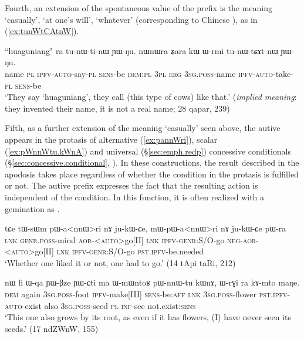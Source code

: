 Fourth, an extension of the spontaneous value of the prefix  is the meaning `casually', `at one's will', `whatever' (corresponding to Chinese ), as in (\ref{ex:tunWtCAtnW}). 

\begin{exe}
\ex \label{ex:tunWtCAtnW}
\gll ``huaguniang" ra tu-nɯ-ti-nɯ ɲɯ-ŋu. nɯnɯra ʑara kɯ ɯ-rmi tu-nɯ-tɕɤt-nɯ ɲɯ-ŋu.  \\
name \textsc{pl}	\textsc{ipfv}-\textsc{auto}-say-\textsc{pl}	\textsc{sens}-be	\textsc{dem}:\textsc{pl}	\textsc{3pl}	\textsc{erg}	\textsc{3sg}.\textsc{poss}-name	\textsc{ipfv}-\textsc{auto}-take-\textsc{pl}	\textsc{sens}-be\\
\glt `They say `huaguniang', they call (this type of cows) like that.' (\textit{implied meaning}: they invented their name, it is not a real name; 28 qapar, 239)
\end{exe}

Fifth, as a further extension of the meaning `casually' seen above, the autive appears in the protasis of alternative (\ref{ex:pannWri}), scalar (\ref{ex:pWnnWtu.kWnA}) and universal (§\ref{sec:emph.redp}) concessive conditionals (§\ref{sec:concessive.conditional}, \citealt[298--300]{jacques14linking}). In these constructions, the result described in the apodosis takes place regardless of whether the condition in the protasis is fulfilled or not. The autive prefix expresses the fact that the resulting action is independent of the condition. In this function, it is often realized with a gemination as .

\begin{exe}
\ex  \label{ex:pannWri}
\gll tɕe tɯ-sɯm pɯ-a<nnɯ>ri nɤ ju-kɯ-ɕe, mɯ-pɯ-a<nnɯ>ri nɤ ju-kɯ-ɕe pɯ-ra \\
\textsc{lnk} \textsc{genr}.\textsc{poss}-mind  \textsc{aor}-<\textsc{auto}>go[II] \textsc{lnk} \textsc{ipfv}-\textsc{genr}:S/O-go \textsc{neg}-\textsc{aor}-<\textsc{auto}>go[II] \textsc{lnk} \textsc{ipfv}-\textsc{genr}:S/O-go \textsc{pst}.\textsc{ipfv}-be.needed \\
\glt `Whether one liked it or not, one had to go.' (14 tApi taRi, 212)
\end{exe}

 \begin{exe}
\ex  \label{ex:pWnnWtu.kWnA}
\gll nɯ li ɯ-qa ɲɯ-βze ɲɯ-ɕti ma ɯ-mɯntoʁ pɯ-nnɯ-tu kɯnɤ, ɯ-rɣi ra kɤ-mto maŋe.  \\
\textsc{dem} again \textsc{3sg}.\textsc{poss}-foot \textsc{ipfv}-make[III] \textsc{sens}-be:\textsc{aff} \textsc{lnk} \textsc{3sg}.\textsc{poss}-flower \textsc{pst}.\textsc{ipfv}-\textsc{auto}-exist also \textsc{3sg}.\textsc{poss}-seed \textsc{pl} \textsc{inf}-see not.exist:\textsc{sens} \\
\glt `This one also grows by its root, as even if it has flowers, (I) have never seen its seeds.' (17 ndZWnW, 155)
\end{exe}

